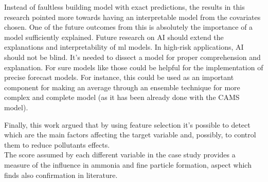 \begin{comment}
In this work, so it is highlighted the effect of how the training in \acrshort{ml} should benefit from an accurate selection of variables. 
\end{comment}
Instead of faultless building model with exact predictions, the results in this research pointed more towards having an interpretable model from the covariates chosen. 
One of the future outcomes from this is absolutely the importance of a model sufficiently explained.
Future research on AI should extend the explanations and interpretability of \acrshort{ml} models.
In high-risk applications, AI should not be blind. 
It's needed to dissect a model for proper comprehension and explanation.
For sure models like those could be helpful for the implementation of precise forecast models.  
For instance, this could be used as an important component for making an average through an ensemble technique for more complex and complete model (as it has been already done with the CAMS model).
\par
Finally, this work argued that by using feature selection it's possible to detect which are the main factors affecting the target variable and, possibly, to control them to reduce pollutants effects.\\
The score assumed by each different variable in the case study provides a measure of the influence in ammonia and fine particle formation, aspect which finds also confirmation in literature.
\begin{comment}
Looking forward, further attempts for reducing pollutant formation should be made by procedures actually used.
\end{comment}
